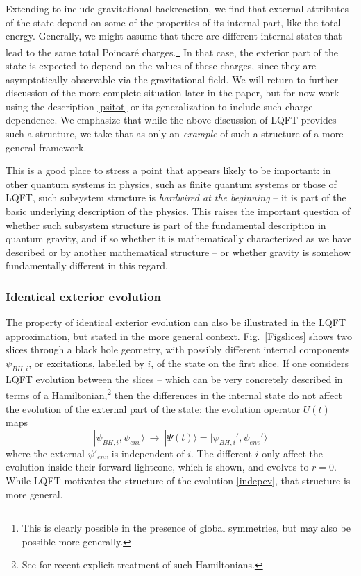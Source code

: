 \documentclass[12pt]{article}
\numberwithin{equation}{section}
\newcommand{\beq}{\begin{equation}}
\newcommand{\eeq}{\end{equation}}
\begin{document}
Extending to include gravitational backreaction, we find that external attributes of the state depend on some of the properties of its internal part, like the total energy.  Generally, we might assume that there are different internal states that lead to the same total Poincar\'e charges.\footnote{This is clearly possible in the presence of global symmetries, but may also be possible more generally.}  In that case, the exterior part of the state is expected to depend on the values of these charges, since they are asymptotically observable via the gravitational field\cite{DoGi4,SGsplit}.  We will return to further discussion of the more complete situation later in the paper, but for now work using the description \eqref{psitot} or its generalization to include such charge dependence.  We emphasize that while the above discussion of LQFT provides such a structure, we take that as only an {\it example} of such a structure of a more general framework.

This is a good place to stress a point that appears likely to be important: in other quantum systems in physics, such as finite quantum systems or those of LQFT, such subsystem structure is {\it hardwired at the beginning} -- it is part of the basic underlying description of the physics.  This raises the important question of whether such subsystem structure is part of the fundamental description in quantum gravity, and if so whether it is mathematically characterized as we have described or by another mathematical 
structure\cite{SGalg}\cite{QFG}\cite{DoGi4,SGsplit} -- or whether gravity is somehow fundamentally different in this regard.

\subsubsection{Identical exterior evolution}

The property of identical exterior evolution can also be illustrated in the LQFT approximation, but stated in the more general context.  Fig.~\ref{Figslices} shows two slices through a black hole geometry, with possibly different internal components $\psi_{BH,i}$, or excitations, labelled by $i$, of the state on the first slice.  If one considers LQFT evolution between the slices -- which can be very concretely described in terms of a Hamiltonian,\footnote{See \cite{SGsch,SG2d,GiPe} for recent explicit treatment of such Hamiltonians.} then the differences in the internal state do not affect the evolution of the external part of the state:  the evolution operator $U(t)$ maps 
\beq\label{indepev}
|\psi_{BH,i},\psi_{env}\rangle\ \rightarrow\ |\Psi(t)\rangle =|\psi_{BH,i}',\psi_{env}'\rangle
\eeq
where
the external $\psi'_{env}$ is independent of $i$.  The different $i$ only affect the evolution inside their forward lightcone, which is shown, and evolves to $r=0$.  While LQFT motivates the structure of the evolution \eqref{indepev}, that structure is more general.
\end{document}
